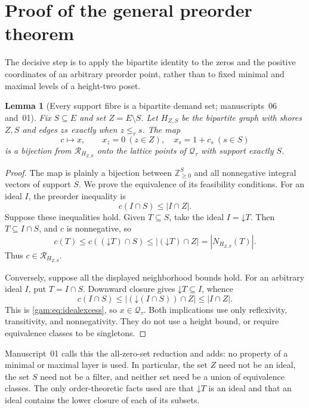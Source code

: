 \documentclass[11pt]{article}
\numberwithin{equation}{section}
\newtheorem{lemma}[theorem]{Lemma}
\theoremstyle{definition}
\newcommand{\N}{\mathbb Z_{\geq0}}
\newcommand{\Qt}{\mathcal Q_\tau}
\newcommand{\down}{\mathord\downarrow}
\begin{document}
\section{Proof of the general preorder theorem}\label{gam:sec:proof}
The decisive step is to apply the bipartite identity to the zeros and the
positive coordinates of an arbitrary preorder point, rather than to fixed
minimal and maximal levels of a height-two poset.

\begin{lemma}[Every support fibre is a bipartite demand set; manuscripts~06 and~01]\label{gam:lem:fibre}
Fix $S\subseteq E$ and set $Z=E\setminus S$. Let $H_{Z,S}$ be the bipartite
graph with shores $Z,S$ and edges $zs$ exactly when $z\le_\tau s$. The map
\begin{equation}
 c\longmapsto x,\qquad x_z=0\ (z\in Z),\quad x_s=1+c_s\ (s\in S)
 \label{gam:eq:fibremap}
\end{equation}
is a bijection from $\mathcal R_{H_{Z,S}}$ onto the lattice points of
$\Qt$ with support exactly $S$.
\end{lemma}
\begin{proof}
The map is plainly a bijection between $\N^S$ and all nonnegative integral
vectors of support $S$. We prove the equivalence of its feasibility
conditions. For an ideal $I$, the preorder inequality is
\begin{equation}
 c(I\cap S)\le |I\cap Z|.
 \label{gam:eq:idealexcess}
\end{equation}
Suppose these inequalities hold. Given $T\subseteq S$, take the ideal
$I=\down T$. Then $T\subseteq I\cap S$, and $c$ is nonnegative, so
\[
 c(T)\le c((\down T)\cap S)
       \le |(\down T)\cap Z|=|N_{H_{Z,S}}(T)|.
\]
Thus $c\in\mathcal R_{H_{Z,S}}$.

Conversely, suppose all the displayed neighborhood bounds hold. For an
arbitrary ideal $I$, put $T=I\cap S$. Downward closure gives
$\down T\subseteq I$, whence
\[
 c(I\cap S)\le |(\down (I\cap S))\cap Z|\le |I\cap Z|.
\]
This is \eqref{gam:eq:idealexcess}, so $x\in\Qt$. Both implications use only
reflexivity, transitivity, and nonnegativity. They do not use a height bound,
or require equivalence classes to be singletons.
\end{proof}
Manuscript~01 calls this the all-zero-set reduction and adds: no property of
a minimal or maximal layer is used. In particular, the set $Z$ need not be an
ideal, the set $S$ need not be a filter, and neither set need be a union of
equivalence classes. The only order-theoretic facts used are that $\down T$
is an ideal and that an ideal contains the lower closure of each of its
subsets.
\end{document}
